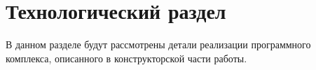 

\chapter{Технологический раздел}

В данном разделе будут рассмотрены детали реализации программного комплекса, описанного в конструкторской части работы.

